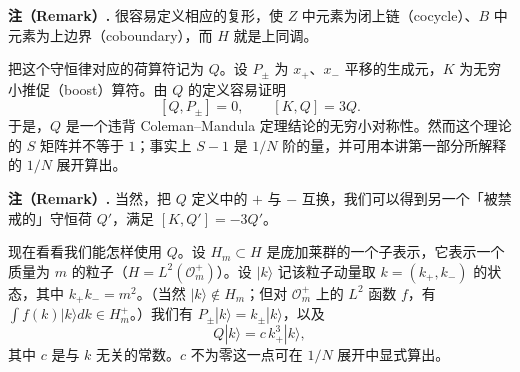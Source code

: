 \textbf{注（Remark）.} 很容易定义相应的复形，使 $Z$ 中元素为闭上链（cocycle）、$B$ 中元素为上边界（coboundary），而 $H$ 就是上同调。

把这个守恒律对应的荷算符记为 $Q$。设 $P_\pm$ 为 $x_+$、$x_-$ 平移的生成元，$K$ 为无穷小推促（boost）算符。由 $Q$ 的定义容易证明
\[
[Q,P_\pm]=0,\qquad [K,Q]=3Q .
\]
于是，$Q$ 是一个违背 Coleman–Mandula 定理结论的无穷小对称性。然而这个理论的 $S$ 矩阵并不等于 $1$；事实上 $S-1$ 是 $1/N$ 阶的量，并可用本讲第一部分所解释的 $1/N$ 展开算出。


\textbf{注（Remark）.} 当然，把 $Q$ 定义中的 $+$ 与 $-$ 互换，我们可以得到另一个「被禁戒的」守恒荷 $Q'$，满足 $[K,Q']=-3Q'$。

现在看看我们能怎样使用 $Q$。设 $H_m\subset H$ 是庞加莱群的一个子表示，它表示一个质量为 $m$ 的粒子（$H=L^2(\mathcal{O}_m^+)$）。设 $|k\rangle$ 记该粒子动量取 $k=(k_+,k_-)$ 的状态，其中 $k_+k_-=m^2$。（当然 $|k\rangle\notin H_m$；但对 $\mathcal{O}_m^+$ 上的 $L^2$ 函数 $f$，有 $\int f(k)|k\rangle dk\in H_m^+$。）我们有 $P_\pm|k\rangle=k_\pm|k\rangle$，以及
\[
Q|k\rangle=c\,k_+^3|k\rangle,
\]
其中 $c$ 是与 $k$ 无关的常数。$c$ 不为零这一点可在 $1/N$ 展开中显式算出。



